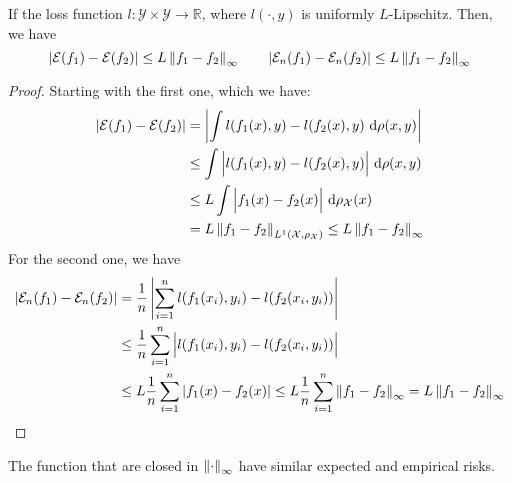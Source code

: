 \begin{proposition}
    If the loss function $l : \mathcal{Y}\times \mathcal{Y}\rightarrow \mathbb{R}$, where $l(\cdot, y)$ is uniformly $L$-Lipschitz. Then, we have
    \begin{equation*}
        \left| \mathcal{E}(f_1) - \mathcal{E}(f_2) \right| \le L\left\lVert f_1-f_2\right\rVert_\infty
        \qquad \left| \mathcal{E}_n(f_1) - \mathcal{E}_n(f_2) \right| \le L\left\lVert f_1-f_2\right\rVert_\infty
    \end{equation*}
\end{proposition}
\begin{proof}
    Starting with the first one, which we have:
    \begin{equation*}
    \begin{aligned}
        \left| \mathcal{E}(f_1) - \mathcal{E}(f_2) \right| &= \left| \int l(f_1(x), y) - l(f_2(x), y)\ \mathrm{d}\rho(x, y) \right| \\
        &\le \int \Big| l(f_1(x), y) - l(f_2(x), y) \Big|\ \mathrm{d}\rho(x, y) \\
        &\le L\int \Big| f_1(x) - f_2(x) \Big|\ \mathrm{d}\rho_\mathcal{X}(x) \\
        &= L\left\lVert f_1-f_2\right\rVert_{L^1(\mathcal{X}, \rho_\mathcal{X})} \le L\left\lVert f_1-f_2\right\rVert_\infty
    \end{aligned}
    \end{equation*}
    For the second one, we have 
    \begin{equation*}
    \begin{aligned}
        \left| \mathcal{E}_n(f_1) - \mathcal{E}_n(f_2) \right| &= \frac{1}{n}\left| \sum^n_{i=1} l(f_1(x_i), y_i) - l(f_2(x_i, y_i))  \right| \\ \
        &\le \frac{1}{n}\sum^n_{i=1}\Big| l(f_1(x_i), y_i) - l(f_2(x_i, y_i)) \Big| \\
        &\le L\frac{1}{n}\sum^n_{i=1}|f_1(x) - f_2(x)| \le L\frac{1}{n}\sum^n_{i=1}\left\lVert f_1-f_2\right\rVert_\infty = L\left\lVert f_1-f_2\right\rVert_\infty
    \end{aligned}
    \end{equation*}
\end{proof}

\begin{remark}
    The function that are closed in $\left\lVert\cdot\right\rVert_\infty$ have similar expected and empirical risks.
\end{remark}

